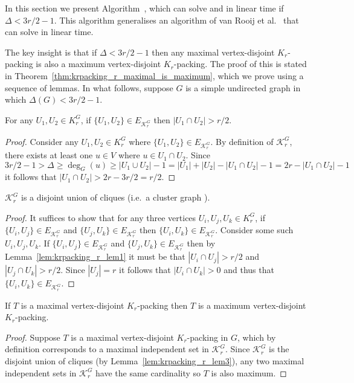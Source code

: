 In this section we present Algorithm~, which can solve \vdkr and \edkr in linear time if $\Delta < 3r/2 - 1$. This algorithm generalises an algorithm of van Rooij et al.\ \cite{van_rooij_partition_2013} that can solve \vdkthree in linear time.

The key insight is that if $\Delta < 3r/2 - 1$ then any maximal vertex-disjoint $K_r$-packing is also a maximum vertex-disjoint $K_r$-packing. The proof of this is stated in Theorem~\ref{thm:krpacking_r_maximal_is_maximum}, which we prove using a sequence of lemmas. In what follows, suppose $G$ is a simple undirected graph in which $\Delta(G) < 3r/2 - 1$.

\begin{lem}
\label{lem:krpacking_r_lem1}
For any $U_1,U_2\in K_r^G$, if $\{ U_1, U_2 \} \in E_{\mathcal{K}_r^G}$ then $|U_1 \cap U_2| > r/2$.
\end{lem}
\begin{proof}
Consider any $U_1,U_2\in K_r^G$ where $\{ U_1, U_2 \} \in E_{\mathcal{K}_r^G}$. By definition of $\mathcal{K}_r^G$, there exists at least one $u\in V$ where $u\in U_1 \cap U_2$. Since $3r/2 - 1 > \Delta \geq \deg_{G}(u) \geq |U_1 \cup U_2| - 1 = |U_1| + |U_2| - |U_1 \cap U_2| - 1 = 2r - |U_1 \cap U_2| - 1$ it follows that $|U_1 \cap U_2| > 2r - 3r/2 = r/2$.
\end{proof}

\begin{lem}
\label{lem:krpacking_r_lem3}
$\mathcal{K}_r^G$ is a disjoint union of cliques (i.e.\ a cluster graph \cite{clustergraphcitation}).
\end{lem}
\begin{proof}
It suffices to show that for any three vertices $U_i, U_j, U_k \in K_r^G$, if $\{ U_i, U_j \} \in E_{\mathcal{K}_r^G}$ and $\{ U_j, U_k \} \in E_{\mathcal{K}_r^G}$ then $\{ U_i, U_k \} \in E_{\mathcal{K}_r^G}$. Consider some such $U_i, U_j, U_k$. If $\{ U_i, U_j \} \in E_{\mathcal{K}_r^G}$ and $\{ U_j, U_k \} \in E_{\mathcal{K}_r^G}$ then by Lemma~\ref{lem:krpacking_r_lem1} it must be that $|U_i \cap U_j| > r/2$ and $|U_j \cap U_k|>r/2$. Since $|U_j|=r$ it follows that $|U_i \cap U_k| > 0$ and thus that $\{ U_i, U_k \} \in E_{\mathcal{K}_r^G}$.
\end{proof}

\begin{thm}
\label{thm:krpacking_r_maximal_is_maximum}
If $T$ is a maximal vertex-disjoint $K_r$-packing then $T$ is a maximum vertex-disjoint $K_r$-packing.
\end{thm}
\begin{proof}
Suppose $T$ is a maximal vertex-disjoint $K_r$-packing in $G$, which by definition corresponds to a maximal independent set in $\mathcal{K}_r^G$. Since $\mathcal{K}_r^G$ is the disjoint union of cliques (by Lemma~\ref{lem:krpacking_r_lem3}), any two maximal independent sets in $\mathcal{K}_r^G$ have the same cardinality so $T$ is also maximum.
\end{proof}

